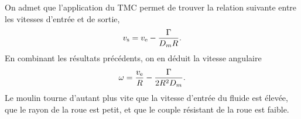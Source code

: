 \documentclass[12pt,fancy]{cours}
\begin{document}
On admet que l'application du TMC permet de trouver la relation suivante entre les vitesses d'entrée et de sortie,
\begin{equation}
v_{\rm{s}}=v_{\rm{e}}-\frac{\Gamma}{D_{m}R}.
\end{equation}
En combinant les résultats précédents, on en déduit la vitesse angulaire
\begin{equation}
\begin{split}
\omega=\dfrac{v_{\rm{e}}}{R}-\frac{\Gamma}{2R^{2}D_m}.
\end{split}
\end{equation}
Le moulin tourne d'autant plus vite que la vitesse d'entrée du fluide est élevée, que le rayon de la roue est petit, et que le couple résistant de la roue est faible.
\end{document}
